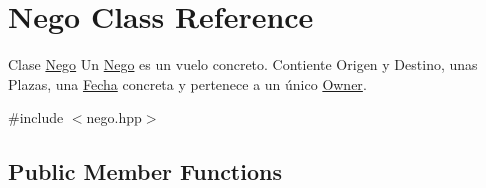 \hypertarget{classNego}{}\section{Nego Class Reference}
\label{classNego}


Clase \hyperlink{classNego}{Nego} Un \hyperlink{classNego}{Nego} es un vuelo concreto. Contiente Origen y Destino, unas Plazas, una \hyperlink{classFecha}{Fecha} concreta y pertenece a un único \hyperlink{classOwner}{Owner}.  




{\ttfamily \#include $<$nego.\+hpp$>$}

\subsection*{Public Member Functions}
